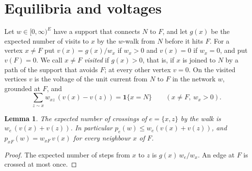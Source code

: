 \documentclass[11pt]{amsart}
\newtheorem{lemma}[theorem]{Lemma}
\theoremstyle{remark}
\newcommand{\one}{\mathbf{1}}
\begin{document}
\section{Equilibria and voltages}\label{sec:eq}

Let $w\in[0,\infty)^E$ have a support that connects $N$ to $F$, and let $g(x)$ be the expected number of visits to
$x$ by the $w$-walk from $N$ before it hits $F$. For a vertex $x\ne F$ put $v(x)=g(x)/w_x$ if $w_x>0$ and $v(x)=0$ if
$w_x=0$, and put $v(F)=0$. We call $x\ne F$ \emph{visited} if $g(x)>0$, that is, if $x$ is joined to $N$ by a path of
the support that avoids $F$; at every other vertex $v=0$. On the visited vertices $v$ is the voltage of the unit
current from $N$ to $F$ in the network $w$, grounded at $F$, and
\begin{equation}\label{eq:kirchhoff}
\sum_{z\sim x}w_{xz}\,(v(x)-v(z))=\one\{x=N\}\qquad(x\ne F,\ w_x>0).
\end{equation}

\begin{lemma}\label{lem:cross}
The expected number of crossings of $e=\{x,z\}$ by the walk is $w_e\,(v(x)+v(z))$. In particular
$p_e(w)\le w_e(v(x)+v(z))$, and $p_{xF}(w)=w_{xF}\,v(x)$ for every neighbour $x$ of $F$.
\end{lemma}
\begin{proof}
The expected number of steps from $x$ to $z$ is $g(x)\,w_e/w_x$. An edge at $F$ is crossed at most once.
\end{proof}
\end{document}
